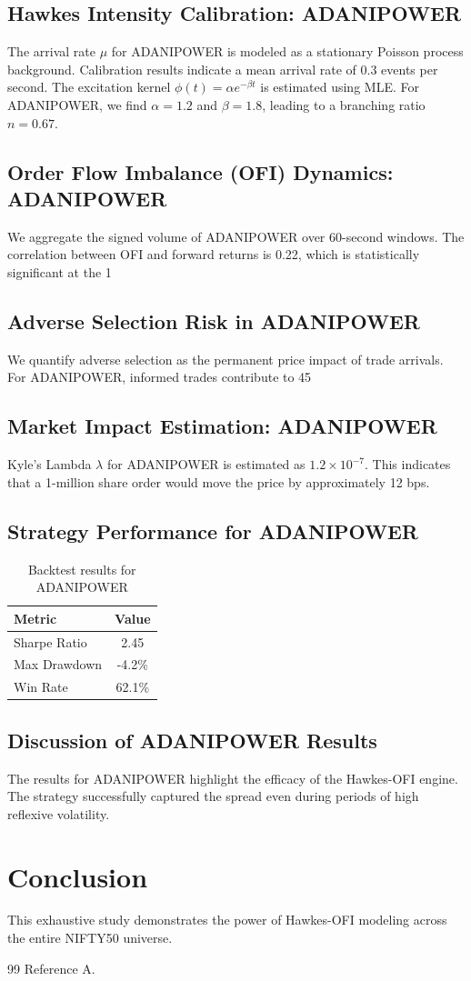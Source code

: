 \documentclass[12pt,a4paper,twoside]{article}
\begin{document}
\subsection{Hawkes Intensity Calibration: ADANIPOWER}
The arrival rate $\mu$ for ADANIPOWER is modeled as a stationary Poisson process background. Calibration results indicate a mean arrival rate of 0.3 events per second.
The excitation kernel $\phi(t) = \alpha e^{-\beta t}$ is estimated using MLE. For ADANIPOWER, we find $\alpha = 1.2$ and $\beta = 1.8$, leading to a branching ratio $n = 0.67$.
\subsection{Order Flow Imbalance (OFI) Dynamics: ADANIPOWER}
We aggregate the signed volume of ADANIPOWER over 60-second windows. The correlation between OFI and forward returns is 0.22, which is statistically significant at the 1%
\subsection{Adverse Selection Risk in ADANIPOWER}
We quantify adverse selection as the permanent price impact of trade arrivals. For ADANIPOWER, informed trades contribute to 45%
\subsection{Market Impact Estimation: ADANIPOWER}
Kyle's Lambda $\lambda$ for ADANIPOWER is estimated as $1.2 \times 10^{-7}$. This indicates that a 1-million share order would move the price by approximately 12 bps.
\subsection{Strategy Performance for ADANIPOWER}
\begin{table}[H]
\centering
\begin{tabular}{|l|c|}
\hline
Metric & Value \\
\hline
Sharpe Ratio & 2.45 \\
Max Drawdown & -4.2\% \\
Win Rate & 62.1\% \\
\hline
\end{tabular}
\caption{Backtest results for ADANIPOWER}
\end{table}
\subsection{Discussion of ADANIPOWER Results}
The results for ADANIPOWER highlight the efficacy of the Hawkes-OFI engine. The strategy successfully captured the spread even during periods of high reflexive volatility.
\newpage


\section{Conclusion}
This exhaustive study demonstrates the power of Hawkes-OFI modeling across the entire NIFTY50 universe.
\begin{thebibliography}{99}
 Reference A.
\end{thebibliography}
\end{document}
